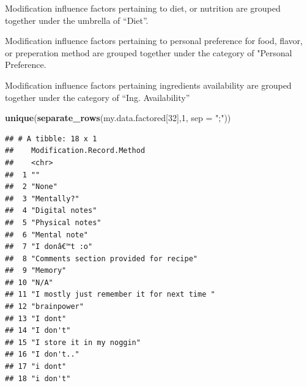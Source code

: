 \documentclass[
]{article}
\newenvironment{Shaded}{\begin{snugshade}}{\end{snugshade}}
\newcommand{\DataTypeTok}[1]{\textcolor[rgb]{0.13,0.29,0.53}{#1}}
\newcommand{\DecValTok}[1]{\textcolor[rgb]{0.00,0.00,0.81}{#1}}
\newcommand{\KeywordTok}[1]{\textcolor[rgb]{0.13,0.29,0.53}{\textbf{#1}}}
\newcommand{\NormalTok}[1]{#1}
\newcommand{\StringTok}[1]{\textcolor[rgb]{0.31,0.60,0.02}{#1}}
\begin{document}
Modification influence factors pertaining to diet, or nutrition are
grouped together under the umbrella of ``Diet''.

Modification influence factors pertaining to personal preference for
food, flavor, or preperation method are grouped together under the
category of "Personal Preference.

Modification influence factors pertaining ingredients availability are
grouped together under the category of ``Ing. Availability''

\begin{Shaded}
\begin{Highlighting}[]
\KeywordTok{unique}\NormalTok{(}\KeywordTok{separate_rows}\NormalTok{(my.data.factored[}\DecValTok{32}\NormalTok{],}\DecValTok{1}\NormalTok{, }\DataTypeTok{sep =} \StringTok{";"}\NormalTok{))}
\end{Highlighting}
\end{Shaded}

\begin{verbatim}
## # A tibble: 18 x 1
##    Modification.Record.Method                
##    <chr>                                     
##  1 ""                                        
##  2 "None"                                    
##  3 "Mentally?"                               
##  4 "Digital notes"                           
##  5 "Physical notes"                          
##  6 "Mental note"                             
##  7 "I donâ€™t :o"                            
##  8 "Comments section provided for recipe"    
##  9 "Memory"                                  
## 10 "N/A"                                     
## 11 "I mostly just remember it for next time "
## 12 "brainpower"                              
## 13 "I dont"                                  
## 14 "I don't"                                 
## 15 "I store it in my noggin"                 
## 16 "I don't.."                               
## 17 "i dont"                                  
## 18 "i don't"
\end{verbatim}
\end{document}
